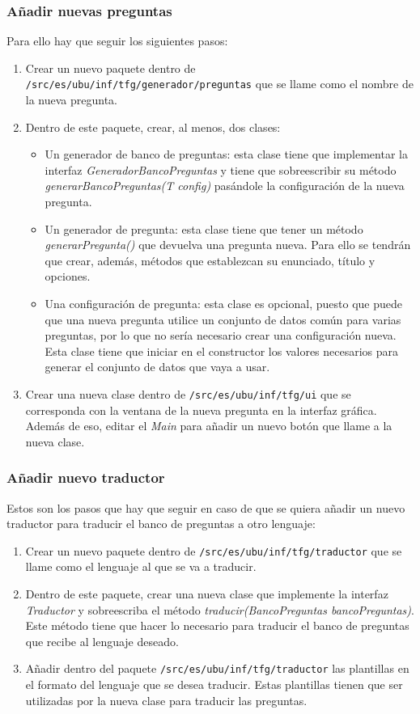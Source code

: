 \subsubsection{Añadir nuevas preguntas}
Para ello hay que seguir los siguientes pasos:
\begin{enumerate}
    \item Crear un nuevo paquete dentro de \texttt{/src/es/ubu/inf/tfg/generador/preguntas} que se llame como el nombre de la nueva pregunta.
    \item Dentro de este paquete, crear, al menos, dos clases:
    \begin{itemize}
        \item Un generador de banco de preguntas: esta clase tiene que implementar la interfaz \textit{GeneradorBancoPreguntas} y tiene que sobreescribir su método \textit{generarBancoPreguntas(T config)} pasándole la configuración de la nueva pregunta.
        \item Un generador de pregunta: esta clase tiene que tener un método \textit{generarPregunta()} que devuelva una pregunta nueva. Para ello se tendrán que crear, además, métodos que establezcan su enunciado, título y opciones. 
        \item Una configuración de pregunta: esta clase es opcional, puesto que puede que una nueva pregunta utilice un conjunto de datos común para varias preguntas, por lo que no sería necesario crear una configuración nueva. Esta clase tiene que iniciar en el constructor los valores necesarios para generar el conjunto de datos que vaya a usar.
    \end{itemize}
    \item Crear una nueva clase dentro de \texttt{/src/es/ubu/inf/tfg/ui} que se corresponda con la ventana de la nueva pregunta en la interfaz gráfica. Además de eso, editar el \textit{Main} para añadir un nuevo botón que llame a la nueva clase. 
\end{enumerate}

\subsubsection{Añadir nuevo traductor}
Estos son los pasos que hay que seguir en caso de que se quiera añadir un nuevo traductor para traducir el banco de preguntas a otro lenguaje:

\begin{enumerate}
    \item Crear un nuevo paquete dentro de \texttt{/src/es/ubu/inf/tfg/traductor} que se llame como el lenguaje al que se va a traducir.
    \item Dentro de este paquete, crear una nueva clase que implemente la interfaz \textit{Traductor} y sobreescriba el método \textit{traducir(BancoPreguntas bancoPreguntas)}. Este método tiene que hacer lo necesario para traducir el banco de preguntas que recibe al lenguaje deseado.
    \item Añadir dentro del paquete \texttt{/src/es/ubu/inf/tfg/traductor} las plantillas en el formato del lenguaje que se desea traducir. Estas plantillas tienen que ser utilizadas por la nueva clase para traducir las preguntas.
\end{enumerate}

